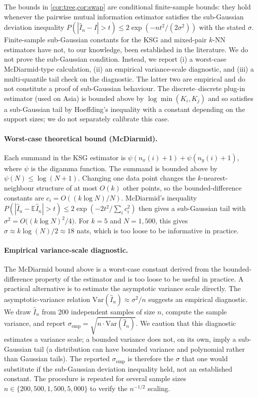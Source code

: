 The bounds in \cref{cor:tree,cor:swap} are
conditional finite-sample bounds: they hold whenever the pairwise
mutual information estimator satisfies the sub-Gaussian deviation
inequality $P(|\hat{I}_n - I| > t) \le 2 \exp(-n t^2 / (2 \sigma^2))$
with the stated $\sigma$. Finite-sample sub-Gaussian constants for
the KSG and mixed-pair $k$-NN estimators have not, to our knowledge,
been established in the literature. We do not prove the sub-Gaussian
condition. Instead, we report (i) a worst-case McDiarmid-type
calculation, (ii) an empirical variance-scale diagnostic, and (iii) a
multi-quantile tail check on the diagnostic. The latter two are
empirical and do not constitute a proof of sub-Gaussian behaviour.
The discrete--discrete plug-in estimator (used on Asia) is bounded
above by $\log\min(K_i, K_j)$ and so satisfies a sub-Gaussian tail
by Hoeffding's inequality with a constant depending on the support
sizes; we do not separately calibrate this case.

\paragraph{Worst-case theoretical bound (McDiarmid).} Each summand in
the KSG estimator is $\psi(n_x(i) + 1) + \psi(n_y(i) + 1)$, where
$\psi$ is the digamma function. The summand is bounded above by
$\psi(N) \le \log(N+1)$. Changing one data point
changes the $k$-nearest-neighbour structure of at most $O(k)$ other
points, so the bounded-difference constants are
$c_i = O((k \log N)/N)$. McDiarmid's inequality
$P(|\hat{I}_n - \mathbb{E}\hat{I}_n| > t) \le 2 \exp(-2 t^2 /
\sum_i c_i^2)$ then gives a sub-Gaussian tail with
$\sigma^2 = O\bigl((k \log N)^2 / 4\bigr)$. For $k = 5$ and $N = 1{,}500$, this gives $\sigma \approx
k \log(N) / 2 \approx 18$ nats, which is too loose to be
informative in practice.

\paragraph{Empirical variance-scale diagnostic.} The McDiarmid bound
above is a worst-case constant derived from the bounded-difference
property of the estimator and is too loose to be useful in practice.
A practical alternative is to estimate the asymptotic variance
scale directly. The asymptotic-variance relation
$\mathrm{Var}(\hat{I}_n) \approx \sigma^2 / n$ suggests an empirical
diagnostic. We draw $\hat{I}_n$ from 200
independent samples of size $n$, compute the sample variance, and
report $\sigma_{\mathrm{emp}} = \sqrt{n \cdot \mathrm{Var}(\hat{I}_n)}$.
We caution that this diagnostic estimates a variance scale; a bounded
variance does not, on its own, imply a sub-Gaussian tail (a
distribution can have bounded variance and polynomial rather than
Gaussian tails). The reported $\sigma_{\mathrm{emp}}$ is therefore the
$\sigma$ that one would substitute if the sub-Gaussian deviation
inequality held, not an established constant. The procedure is
repeated for several sample sizes $n \in \{200, 500, 1{,}500,
5{,}000\}$ to verify the $n^{-1/2}$ scaling.

